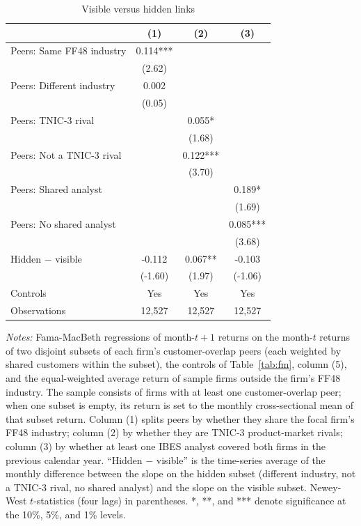 \begin{table}[!htbp]\centering
\caption{Visible versus hidden links}\label{tab:visibility}
\footnotesize
\begin{tabular*}{\linewidth}{@{\extracolsep{\fill}}lccc}
\toprule
 & (1) & (2) & (3) \\
\midrule
Peers: Same FF48 industry & 0.114*** &  &  \\
 & (2.62) &  &  \\
Peers: Different industry & 0.002 &  &  \\
 & (0.05) &  &  \\
Peers: TNIC-3 rival &  & 0.055* &  \\
 &  & (1.68) &  \\
Peers: Not a TNIC-3 rival &  & 0.122*** &  \\
 &  & (3.70) &  \\
Peers: Shared analyst &  &  & 0.189* \\
 &  &  & (1.69) \\
Peers: No shared analyst &  &  & 0.085*** \\
 &  &  & (3.68) \\
\addlinespace
Hidden $-$ visible & -0.112 & 0.067** & -0.103 \\
 & (-1.60) & (1.97) & (-1.06) \\
\addlinespace
Controls & Yes & Yes & Yes \\
Observations & 12,527 & 12,527 & 12,527 \\
\bottomrule
\end{tabular*}
\par\vspace{4pt}\begin{minipage}{\linewidth}\scriptsize \emph{Notes:} Fama-MacBeth regressions of month-$t+1$ returns on the month-$t$ returns of two disjoint subsets of each firm's customer-overlap peers (each weighted by shared customers within the subset), the controls of Table~\ref{tab:fm}, column (5), and the equal-weighted average return of sample firms outside the firm's FF48 industry. The sample consists of firms with at least one customer-overlap peer; when one subset is empty, its return is set to the monthly cross-sectional mean of that subset return. Column (1) splits peers by whether they share the focal firm's FF48 industry; column (2) by whether they are TNIC-3 product-market rivals; column (3) by whether at least one IBES analyst covered both firms in the previous calendar year. ``Hidden $-$ visible'' is the time-series average of the monthly difference between the slope on the hidden subset (different industry, not a TNIC-3 rival, no shared analyst) and the slope on the visible subset. Newey-West $t$-statistics (four lags) in parentheses. *, **, and *** denote significance at the 10\%, 5\%, and 1\% levels.\end{minipage}
\end{table}